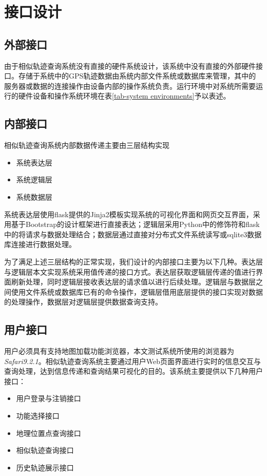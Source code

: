 
\section{接口设计}
\label{sec:interface design}

\subsection{外部接口}
\label{subsec:external interface}
由于相似轨迹查询系统没有直接的硬件系统设计，该系统中没有直接的外部硬件接口。存储于系统中的GPS轨迹数据由系统内部文件系统或数据库来管理，其中的服务器或数据的连接操作由设备内部的操作系统负责。运行环境中对系统所需要运行的硬件设备和操作系统环境在表\ref{tab-system environments}予以表述。

\subsection{内部接口}
\label{subsec:internal interface}
相似轨迹查询系统内部数据传递主要由三层结构实现
\begin{itemize}
	\item 系统表达层
	\item 系统逻辑层
	\item 系统数据层
\end{itemize}
系统表达层使用flask提供的Jinja2\cite{flasklibrary}模板实现系统的可视化界面和网页交互界面，采用基于Bootstrap的设计框架进行直接表达；逻辑层采用Python中的修饰符和flask中的将请求与数据处理结合；数据层通过直接对分布式文件系统读写或sqlite3数据库连接进行数据处理。

\begin{figure}[!htp]
    \centering
    \resizebox{!}{!}{}
\end{figure}

为了满足上述三层结构的正常实现，我们设计的内部接口主要为以下几种。表达层与逻辑层本文实现系统采用值传递的接口方式。表达层获取逻辑层传递的值进行界面刷新处理，同时逻辑层接收表达层的请求值以进行后续处理。逻辑层与数据层之间使用文件系统或数据库已有的命令操作，逻辑层借用底层提供的接口实现对数据的处理操作，数据层对逻辑层提供数据查询支持。

\subsection{用户接口}
\label{ubsection:user interface}
用户必须具有支持地图加载功能浏览器，本文测试系统所使用的浏览器为\emph{Safari9.2.1}。相似轨迹查询系统主要通过用户Web页面界面进行实时的信息交互与查询处理，达到信息传递和查询结果可视化的目的。该系统主要提供以下几种用户接口：
\begin{itemize}
	\item 用户登录与注销接口
	\item 功能选择接口
	\item 地理位置点查询接口
	\item 相似轨迹查询接口
	\item 历史轨迹展示接口
\end{itemize}

